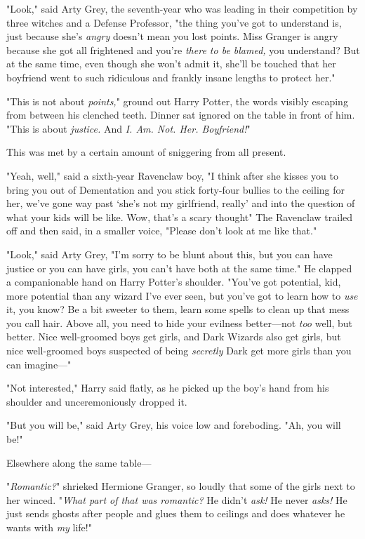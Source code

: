 "Look," said Arty Grey, the seventh-year who was leading in their competition
by three witches and a Defense Professor, "the thing you've got to understand
is, just because she's \emph{angry} doesn't mean you lost points. Miss Granger
is angry because she got all frightened and you're \emph{there to be blamed,}
you understand? But at the same time, even though she won't admit it, she'll be
touched that her boyfriend went to such ridiculous and frankly insane lengths
to protect her."

"This is not about \emph{points,}" ground out Harry Potter, the words visibly
escaping from between his clenched teeth. Dinner sat ignored on the table in
front of him. "This is about \emph{justice.} And \emph{I. Am. Not. Her.
Boyfriend!}"

This was met by a certain amount of sniggering from all present.

"Yeah, well," said a sixth-year Ravenclaw boy, "I think after she kisses you to
bring you out of Dementation and you stick forty-four bullies to the ceiling
for her, we've gone way past `she's not my girlfriend, really' and into the
question of what your kids will be like. Wow, that's a scary thought{\el}"
The Ravenclaw trailed off and then said, in a smaller voice, "Please don't look
at me like that."

"Look," said Arty Grey, "I'm sorry to be blunt about this, but you can have
justice or you can have girls, you can't have both at the same time." He
clapped a companionable hand on Harry Potter's shoulder. "You've got potential,
kid, more potential than any wizard I've ever seen, but you've got to learn how
to \emph{use} it, you know? Be a bit sweeter to them, learn some spells to
clean up that mess you call hair. Above all, you need to hide your evilness
better---not \emph{too} well, but better. Nice well-groomed boys get girls, and
Dark Wizards also get girls, but nice well-groomed boys suspected of being
\emph{secretly} Dark get more girls than you can imagine\mbox{---}"

"Not interested," Harry said flatly, as he picked up the boy's hand from his
shoulder and unceremoniously dropped it.

"But you will be," said Arty Grey, his voice low and foreboding. "Ah, you will
be!"

Elsewhere along the same table---

"\emph{Romantic?}" shrieked Hermione Granger, so loudly that some of the girls
next to her winced. "\emph{What part of that was romantic?} He didn't
\emph{ask!} He never \emph{asks!} He just sends ghosts after people and glues
them to ceilings and does whatever he wants with \emph{my} life!"

